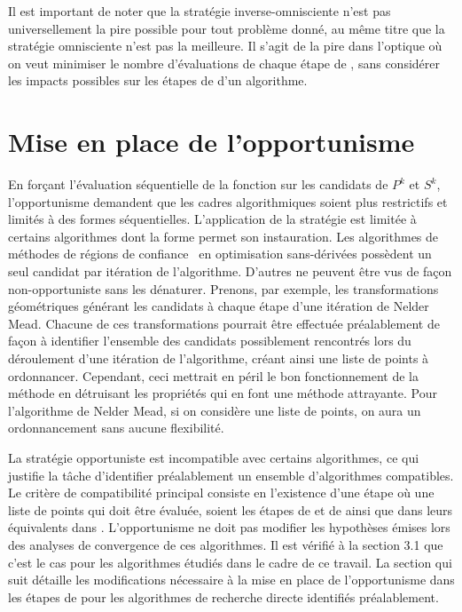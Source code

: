 Il est important de noter que la stratégie inverse-omnisciente n'est pas universellement la pire possible pour tout problème donné, au même titre que la stratégie omnisciente n'est pas la meilleure. Il s'agit de la pire dans l'optique où on veut minimiser le nombre d'évaluations de chaque étape de \POLL, sans considérer les impacts possibles sur les étapes de \SEARCH d'un algorithme.
\section{Mise en place de l'opportunisme}\label{sec:mis}
En forçant l'évaluation séquentielle de la fonction sur les candidats de $P^k$ et $S^k$, l'opportunisme demandent que les cadres algorithmiques soient plus restrictifs et limités à des formes séquentielles. L'application de la stratégie est limitée à certains algorithmes dont la forme permet son instauration. Les algorithmes de méthodes de régions de confiance~\cite{CoScVibook,CoGoTo00a} en optimisation sans-dérivées possèdent un seul candidat par itération de l'algorithme. D'autres ne peuvent être vus de façon non-opportuniste sans les dénaturer. Prenons, par exemple, les transformations géométriques générant les candidats à chaque étape d'une itération de Nelder Mead. Chacune de ces transformations pourrait être effectuée préalablement de façon à identifier l'ensemble des candidats possiblement rencontrés lors du déroulement d'une itération de l'algorithme, créant ainsi une liste de points à ordonnancer. Cependant, ceci mettrait en péril le bon fonctionnement de la méthode en détruisant les propriétés qui en font une méthode attrayante. Pour l'algorithme de Nelder Mead, si on considère une liste de points, on aura un ordonnancement sans aucune flexibilité.

La stratégie opportuniste est incompatible avec certains algorithmes, ce qui justifie la tâche d'identifier préalablement un ensemble d'algorithmes compatibles. Le critère de compatibilité principal consiste en l'existence d'une étape où une liste de points qui doit être évaluée, soient les étapes de \SEARCH et de \POLL ainsi que dans leurs équivalents dans \imfil. L'opportunisme ne doit pas modifier les hypothèses émises lors des analyses de convergence de ces algorithmes. Il est vérifié à la section 3.1 que c'est le cas pour les algorithmes étudiés dans le cadre de ce travail. La section qui suit détaille les modifications nécessaire à la mise en place de l'opportunisme dans les étapes de \POLL pour les algorithmes de recherche directe identifiés préalablement. 
  
